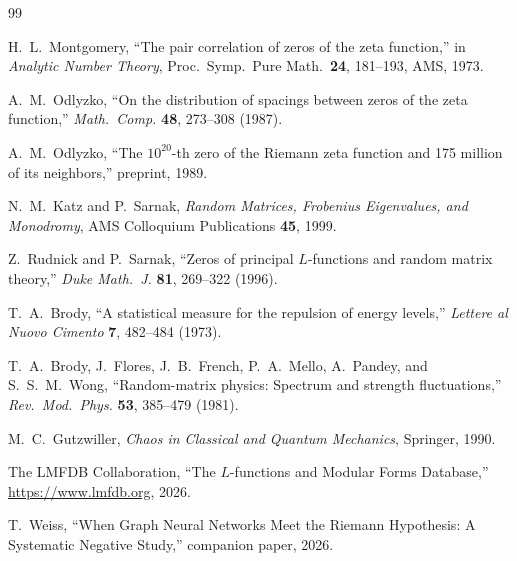 \documentclass[11pt]{article}
\begin{document}
\begin{thebibliography}{99}

H.~L.~Montgomery,
``The pair correlation of zeros of the zeta function,''
in \emph{Analytic Number Theory},
Proc.\ Symp.\ Pure Math.\ \textbf{24}, 181--193, AMS, 1973.

A.~M.~Odlyzko,
``On the distribution of spacings between zeros of the zeta function,''
\emph{Math.\ Comp.} \textbf{48}, 273--308 (1987).

A.~M.~Odlyzko,
``The $10^{20}$-th zero of the Riemann zeta function and 175 million of
its neighbors,''
preprint, 1989.

N.~M.~Katz and P.~Sarnak,
\emph{Random Matrices, Frobenius Eigenvalues, and Monodromy},
AMS Colloquium Publications \textbf{45}, 1999.

Z.~Rudnick and P.~Sarnak,
``Zeros of principal $L$-functions and random matrix theory,''
\emph{Duke Math.\ J.} \textbf{81}, 269--322 (1996).

T.~A.~Brody,
``A statistical measure for the repulsion of energy levels,''
\emph{Lettere al Nuovo Cimento} \textbf{7}, 482--484 (1973).

T.~A.~Brody, J.~Flores, J.~B.~French, P.~A.~Mello,
A.~Pandey, and S.~S.~M.~Wong,
``Random-matrix physics: Spectrum and strength fluctuations,''
\emph{Rev.\ Mod.\ Phys.} \textbf{53}, 385--479 (1981).

M.~C.~Gutzwiller,
\emph{Chaos in Classical and Quantum Mechanics},
Springer, 1990.

The LMFDB Collaboration,
``The $L$-functions and Modular Forms Database,''
\url{https://www.lmfdb.org}, 2026.

T.~Weiss,
``When Graph Neural Networks Meet the Riemann Hypothesis:
A Systematic Negative Study,''
companion paper, 2026.

\end{thebibliography}
\end{document}
